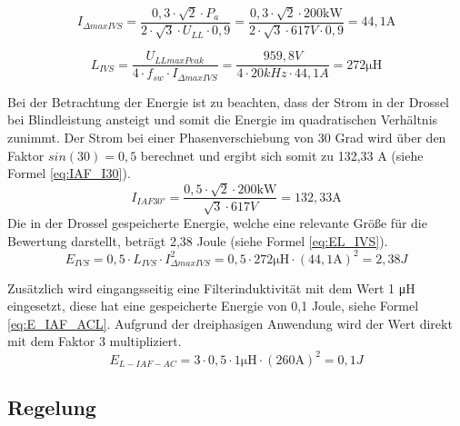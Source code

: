 		\begin{equation}
		\label{eq:DeltaIIVS}
		I_{\Delta max IVS}=\dfrac{0,3\cdot \sqrt{2} \cdot P_{a}}{2 \cdot \sqrt{3} \cdot U_{LL} \cdot 0,9} = \dfrac{0,3\cdot \sqrt{2} \cdot 200 \si{\kilo \watt}}{2 \cdot \sqrt{3} \cdot 617 \si{V} \cdot 0,9} = 44,1 \si{\A}
		\end{equation}
		
		\begin{equation}
			\label{eq:Livs}
			L_{IVS}= \dfrac{U_{LLmaxPeak}}{4\cdot f_{sw} \cdot I_{\Delta max IVS}} = \dfrac{959,8 V}{4 \cdot 20 kHz \cdot 44,1 A}= 272 \si{\micro \henry}
		\end{equation}
		
		Bei der Betrachtung der Energie ist zu beachten, dass der Strom in der Drossel bei Blindleistung ansteigt und somit die Energie im quadratischen Verhältnis zunimmt. Der Strom bei einer Phasenverschiebung von 30 Grad wird über den Faktor $sin(30)=0,5$ berechnet und ergibt sich somit zu 132,33 A (siehe Formel \ref{eq:IAF_I30}).
		\begin{equation}
			\label{eq:IAF_I30}
			I_{IAF30°}=\dfrac{0,5\cdot \sqrt{2} \cdot 200 \si{\kilo \watt}} { \sqrt{3} \cdot 617 \si{V}} = 132,33 \si{\A}
		\end{equation}
		Die in der Drossel gespeicherte Energie, welche eine relevante Größe für die Bewertung darstellt, beträgt 2,38 Joule (siehe Formel \ref{eq:EL_IVS}).
		\begin{equation}
			\label{eq:EL_IVS}
			E_{IVS}=0,5 \cdot L_{IVS} \cdot I_{\Delta max IVS}^{2} = 0,5 \cdot 272 \si{\micro \henry} \cdot (44,1 \si{\A})^{2} =  2,38 J
		\end{equation}
		
		
		Zusätzlich wird eingangsseitig eine Filterinduktivität mit dem Wert 1 \si{\micro \henry} eingesetzt, diese hat eine gespeicherte Energie von 0,1 Joule, siehe Formel \ref{eq:E_IAF_ACL}. Aufgrund der dreiphasigen Anwendung wird der Wert direkt mit dem Faktor 3 multipliziert.
			\begin{equation}
			\label{eq:E_IAF_ACL}
			E_{L-IAF-AC}=3\cdot 0,5 \cdot 1 \si{\micro \henry} \cdot (260 \si{\ampere})^{2} = 0,1 J
		\end{equation}
	
	\subsection{Regelung}
		
